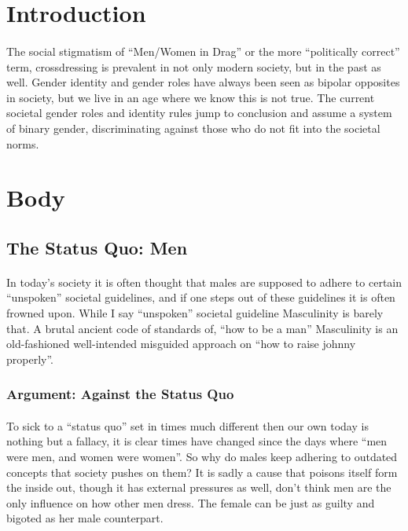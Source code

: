 \doublespacing{}
\section{Introduction}
\paragraph{}
The social stigmatism of ``Men/Women in Drag'' or the more ``politically
correct'' term, crossdressing is prevalent in not only modern society, but in
the past as well. Gender identity and gender roles have always been seen as
bipolar opposites in society, but we live in an age where we know this is not
true. The current societal gender roles and identity rules jump to conclusion
and assume a system of binary gender, discriminating against those who do not
fit into the societal norms.
\par

\section{Body}
\subsection{The Status Quo: Men}
\paragraph{}
In today's society it is often thought that males are supposed to adhere to
certain ``unspoken'' societal guidelines, and if one steps out of these
guidelines it is often frowned upon. While I say ``unspoken'' societal guideline
Masculinity is barely that. A brutal ancient code of standards of, ``how to be a
man'' Masculinity is an old-fashioned well-intended misguided approach on ``how
to raise johnny properly''.
\par

\subsubsection{Argument: Against the Status Quo}
\paragraph{}
To sick to a ``status quo'' set in times much different then our own today is
nothing but a fallacy, it is clear times have changed since the days where ``men
were men, and women were women''. So why do males keep adhering to outdated
concepts that society pushes on them? It is sadly a cause that poisons itself
form the inside out, though it has external pressures as well, don't think men
are the only influence on how other men dress. The female can be just as guilty
and bigoted as her male counterpart.
\par

